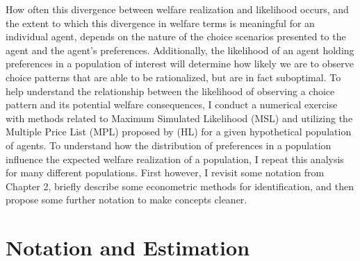 \documentclass[../main.tex]{subfiles}
\begin{document}
How often this divergence between welfare realization and likelihood occurs, and the extent to which this divergence in welfare terms is meaningful for an individual agent, depends on the nature of the choice scenarios presented to the agent and the agent's preferences.
Additionally, the likelihood of an agent holding preferences in a population of interest will determine how likely we are to observe choice patterns that are able to be rationalized, but are in fact suboptimal.
To help understand the relationship between the likelihood of observing a choice pattern and its potential welfare consequences, I conduct a numerical exercise with methods related to Maximum Simulated Likelihood (MSL) and utilizing the Multiple Price List (MPL) proposed by \textcite{Holt2002} (HL) for a given hypothetical population of agents.
To understand how the distribution of preferences in a population influence the expected welfare realization of a population, I repeat this analysis for many different populations.
First however, I revisit some notation from Chapter 2, briefly describe some econometric methods for identification, and then propose some further notation to make concepts cleaner.

\singlespacing
\section{Notation and Estimation} \label{ssec:Notation}
\doublespacing
\end{document}
